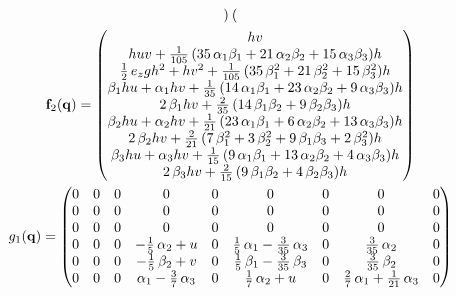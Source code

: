 \documentclass{article}
\begin{document}
\begin{gather}
\begin{pmatrix}
        \end{pmatrix} \\
        \mathbf{f}_2(\mathbf{q}) =
        \begin{pmatrix}
          h v \\
          h u v + \frac{1}{105} \, {(35 \, \alpha_{1} \beta_{1} + 21 \, \alpha_{2} \beta_{2} + 15 \, \alpha_{3} \beta_{3})} h \\
          \frac{1}{2} \, e_{z} g h^{2} + h v^{2} + \frac{1}{105} \, {(35 \, \beta_{1}^{2} + 21 \, \beta_{2}^{2} + 15 \, \beta_{3}^{2})} h \\
          \beta_{1} h u + \alpha_{1} h v + \frac{1}{35} \, {(14 \, \alpha_{1} \beta_{1} + 23 \, \alpha_{2} \beta_{2} + 9 \, \alpha_{3} \beta_{3})} h \\
          2 \, \beta_{1} h v + \frac{2}{35} \, {(14 \, \beta_{1} \beta_{2} + 9 \, \beta_{2} \beta_{3})} h \\
          \beta_{2} h u + \alpha_{2} h v + \frac{1}{21} \, {(23 \, \alpha_{1} \beta_{1} + 6 \, \alpha_{2} \beta_{2} + 13 \, \alpha_{3} \beta_{3})} h \\
          2 \, \beta_{2} h v + \frac{2}{21} \, {(7 \, \beta_{1}^{2} + 3 \, \beta_{2}^{2} + 9 \, \beta_{1} \beta_{3} + 2 \, \beta_{3}^{2})} h \\
          \beta_{3} h u + \alpha_{3} h v + \frac{1}{15} \, {(9 \, \alpha_{1} \beta_{1} + 13 \, \alpha_{2} \beta_{2} + 4 \, \alpha_{3} \beta_{3})} h \\
          2 \, \beta_{3} h v + \frac{2}{15} \, {(9 \, \beta_{1} \beta_{2} + 4 \, \beta_{2} \beta_{3})} h
        \end{pmatrix} \\
        g_1(\mathbf{q}) =
        \begin{pmatrix}
          0 & 0 & 0 & 0 & 0 & 0 & 0 & 0 & 0 \\
          0 & 0 & 0 & 0 & 0 & 0 & 0 & 0 & 0 \\
          0 & 0 & 0 & 0 & 0 & 0 & 0 & 0 & 0 \\
          0 & 0 & 0 & -\frac{1}{5} \, \alpha_{2} + u & 0 & \frac{1}{5} \, \alpha_{1} - \frac{3}{35} \, \alpha_{3} & 0 & \frac{3}{35} \, \alpha_{2} & 0 \\
          0 & 0 & 0 & -\frac{1}{5} \, \beta_{2} + v & 0 & \frac{1}{5} \, \beta_{1} - \frac{3}{35} \, \beta_{3} & 0 & \frac{3}{35} \, \beta_{2} & 0 \\
          0 & 0 & 0 & \alpha_{1} - \frac{3}{7} \, \alpha_{3} & 0 & \frac{1}{7} \, \alpha_{2} + u & 0 & \frac{2}{7} \, \alpha_{1} + \frac{1}{21} \, \alpha_{3} & 0 \\

\end{pmatrix}
\end{gather}
\end{document}
